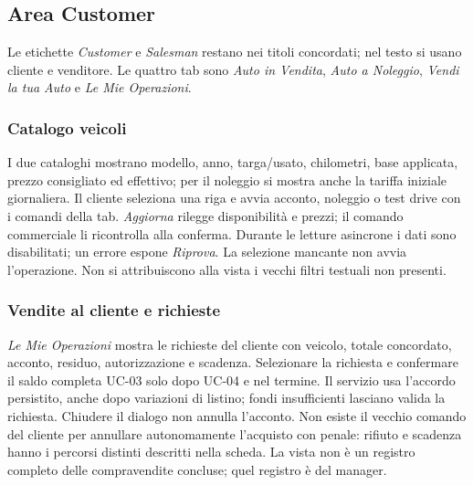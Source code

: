 \subsection{Area Customer}
Le etichette \emph{Customer} e \emph{Salesman} restano nei titoli concordati;
nel testo si usano cliente e venditore. Le quattro tab sono \emph{Auto in
Vendita}, \emph{Auto a Noleggio}, \emph{Vendi la tua Auto} e \emph{Le Mie Operazioni}.

\subsubsection{Catalogo veicoli}
I due cataloghi mostrano modello, anno, targa/usato, chilometri, base
applicata, prezzo consigliato ed effettivo; per il noleggio si mostra anche
la tariffa iniziale giornaliera. Il cliente seleziona una riga e avvia
acconto, noleggio o test drive con i comandi della tab. \emph{Aggiorna}
rilegge disponibilità e prezzi; il comando commerciale li ricontrolla alla
conferma. Durante le letture asincrone i dati sono disabilitati; un errore
espone \emph{Riprova}. La selezione mancante non avvia l'operazione.
Non si attribuiscono alla vista i vecchi filtri testuali non presenti.
\clearpage

\subsubsection{Vendite al cliente e richieste}
\emph{Le Mie Operazioni} mostra le richieste del cliente con veicolo,
totale concordato, acconto, residuo, autorizzazione e scadenza. Selezionare
la richiesta e confermare il saldo completa UC-03 solo dopo UC-04 e nel
termine. Il servizio usa l'accordo persistito, anche dopo variazioni di
listino; fondi insufficienti lasciano valida la richiesta. Chiudere il
dialogo non annulla l'acconto. Non esiste il vecchio comando del cliente
per annullare autonomamente l'acquisto con penale: rifiuto e scadenza hanno
i percorsi distinti descritti nella scheda. La vista non è un registro
completo delle compravendite concluse; quel registro è del manager.

